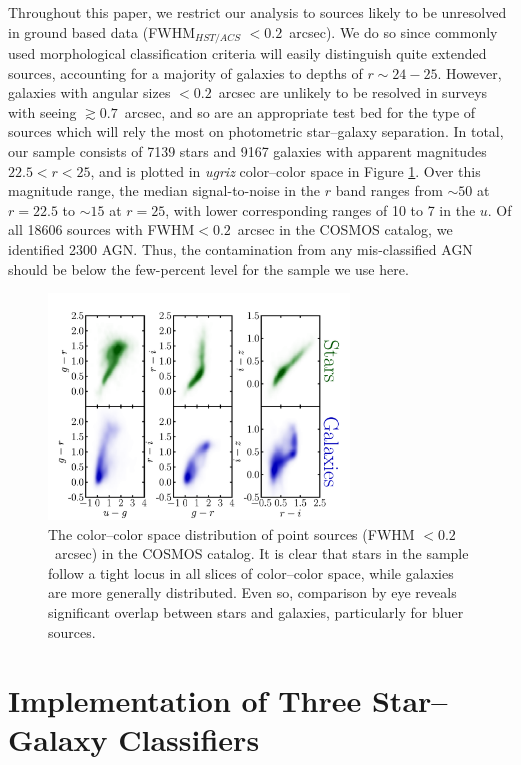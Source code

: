 \documentclass[12pt,preprint]{aastex}
\begin{document}
Throughout this paper, we restrict our analysis to sources likely to
be unresolved in ground based data (FWHM$_{HST/ACS}$ $< 0.2$~arcsec).  We
do so since commonly used morphological classification criteria will
easily distinguish quite extended sources, accounting for a majority
of galaxies to depths of $r\sim24-25$.  However, galaxies with angular
sizes $< 0.2$~arcsec are unlikely to be resolved in surveys with seeing
$\gtrsim0.7$~arcsec, and so are an appropriate test bed for the type of sources
which will rely the most on photometric star--galaxy separation.  In
total, our sample consists of 7139 stars and 9167 galaxies with apparent 
magnitudes $22.5<r<25$, and is plotted in {\it ugriz} color--color space in
Figure \ref{fig:color-color-data}.   Over this magnitude range, the median 
signal-to-noise in the $r$ band ranges from $\sim50$ at $r=22.5$ to 
$\sim15$ at $r=25$, with lower corresponding ranges of 10 to 7 in the $u$.  
Of all 18606 sources with FWHM$<0.2$~arcsec in the COSMOS catalog, we 
identified 2300 AGN.  Thus, the contamination from any mis-classified AGN 
should be below the few-percent level for the sample we use here.

\begin{figure}
\centering
 \includegraphics[clip=true, trim=0cm 0cm 0.0cm 0.cm,width=8cm]{fig2.pdf}
\caption{The color--color space distribution of point sources (FWHM $<
  0.2$~arcsec) in the COSMOS catalog.  It is clear that stars in the sample
  follow a tight locus in all slices of color--color space, while
  galaxies are more generally distributed.  Even so, comparison by eye
  reveals significant overlap between stars and galaxies, particularly
  for bluer sources.}
\label{fig:color-color-data}
\end{figure}

%
%


\section{Implementation of Three Star--Galaxy Classifiers}
\label{sec:specifics}
\end{document}

